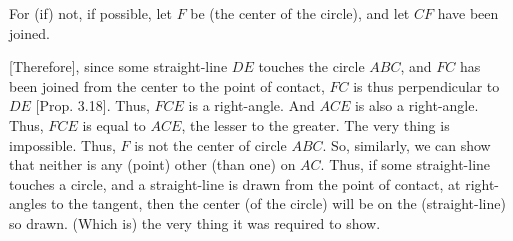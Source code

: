\begin{Parallel}{}{}
{For (if) not, if possible, let $F$ be (the center of the circle), and let
$CF$ have been joined.

\mbox{[}Therefore], since some straight-line $DE$ touches the circle $ABC$, and
$FC$ has been joined from the center to the point of contact, $FC$ is thus
perpendicular to $DE$ [Prop. 3.18]. Thus, $FCE$ is a right-angle.
And $ACE$ is also a right-angle. Thus, $FCE$ is equal to $ACE$, the lesser to the
greater. The very thing is impossible. Thus, $F$ is not the center of circle $ABC$. 
So, similarly, we can show that neither is any (point) other (than one) on $AC$.\nline
Thus, if some straight-line touches a circle, and a straight-line is drawn from the
point of contact, at
right-angles to the tangent, then the center (of the circle) will be on the (straight-line) so drawn. (Which is) the very thing it was required to show.}
\end{Parallel}

